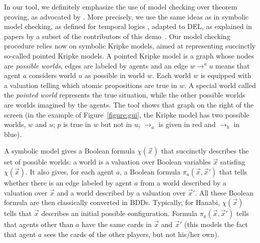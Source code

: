 In our tool, we definitely emphasize the use of model checking over theorem proving, as advocated by \citet{DBLP:conf/kr/HalpernV91}. More precisely, we use the same ideas as in symbolic model checking, as defined for temporal logics \cite{DBLP:conf/lics/BurchCMDH90}, adapted to DEL, as explained in papers by a subset of the contributors of this demo~\cite{DBLP:conf/atal/CharrierS17,DBLP:conf/aiml/CharrierS18}. Our model checking procedure relies now on symbolic Kripke models, aimed at representing succinctly so-called pointed Kripke models. A pointed Kripke model is a graph whose nodes are \emph{possible worlds}, edges are labeled by agents and an edge $w \rightarrow^a u$ means that agent $a$ considers world $u$ as possible in world $w$. Each world $w$ is equipped with a valuation telling which atomic propositions are true in $w$. A special world called the \emph{pointed world} represents the true situation, while the other possible worlds are worlds imagined by the agents.
The tool shows that graph on the right of the screen (in the example of Figure~\ref{figure:gui}, the Kripke model has two possible worlds, $w$ and $u$; $p$ is true in $w$ but not in $u$; $\rightarrow_a$ is given in red and $\rightarrow_b$ in blue). 


\newcommand{\succinctsetworlds}{\chi}
\newcommand{\succinctrelation}[1]{\pi_{#1}}
 A symbolic model gives a Boolean formula $\succinctsetworlds(\vec x)$ that succinctly  describes the set of possible worlds: a world is a valuation over Boolean variables $\vec x$ satisfing $\succinctsetworlds(\vec x)$. It also gives, for each agent $a$, a Boolean formula $\succinctrelation a(\vec x, \vec x')$ that tells whether there is an edge labeled by agent $a$ from a world described by a valuation over $\vec x$ and  a world described by a valuation over $\vec x'$. All these Boolean formula are then classically converted in BDDs. %
%
%
Typically, for Hanabi, $\succinctsetworlds(\vec x)$ tells that $\vec x$ describes an initial possible configuration. Formula $\succinctrelation a(\vec x, \vec x')$ tells that agents other than $a$ have the same cards in $\vec x$ and $\vec x'$ (this models the fact that agent $a$ sees the cards of the other players, but not his/her own).

